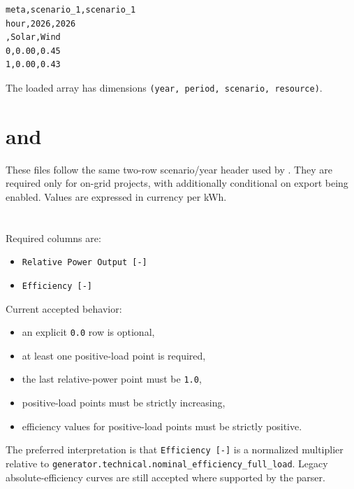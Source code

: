 \documentclass[11pt,a4paper]{report}
\newcommand{\code}[1]{\texttt{#1}}
\begin{document}
\begin{lstlisting}[style=mgpy]
meta,scenario_1,scenario_1
hour,2026,2026
,Solar,Wind
0,0.00,0.45
1,0.00,0.43
\end{lstlisting}

The loaded array has dimensions \code{(year, period, scenario, resource)}.

\section{ and }

These files follow the same two-row scenario/year header used by . They are required only for on-grid projects, with  additionally conditional on export being enabled. Values are expressed in currency per kWh.

\section{}

Required columns are:

\begin{itemize}[leftmargin=1.5em]
  \item \code{Relative Power Output [-]}
  \item \code{Efficiency [-]}
\end{itemize}

Current accepted behavior:

\begin{itemize}[leftmargin=1.5em]
  \item an explicit \code{0.0} row is optional,
  \item at least one positive-load point is required,
  \item the last relative-power point must be \code{1.0},
  \item positive-load points must be strictly increasing,
  \item efficiency values for positive-load points must be strictly positive.
\end{itemize}

The preferred interpretation is that \code{Efficiency [-]} is a normalized multiplier relative to \code{generator.technical.nominal\_efficiency\_full\_load}. Legacy absolute-efficiency curves are still accepted where supported by the parser.

\section{}
\end{document}

